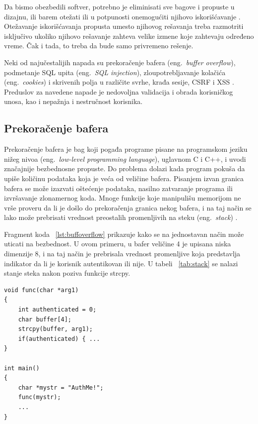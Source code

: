 \documentclass[a4paper]{article}
\begin{document}
Da bismo obezbedili softver, potrebno je eliminisati sve bagove i propuste u dizajnu, ili barem otežati ili u potpunosti onemogućiti njihovo iskorišćavanje \cite{top10flaws}. Otežavanje iskorišćavanja propusta umesto njihovog rešavanja treba razmotriti isključivo ukoliko njihovo rešavanje zahteva velike izmene koje zahtevaju određeno vreme. Čak i tada, to treba da bude samo privremeno rešenje.

Neki od najučestalijih napada su prekoračenje bafera (eng.~{\em buffer overflow}), podmetanje SQL upita (eng.~{\em SQL injection}), zloupotrebljavanje kolačića (eng.~{\em cookies}) i skrivenih polja u različite svrhe, krađa sesije, CSRF i XSS \cite{frontmatter}.
Preduslov za navedene napade je nedovoljna validacija i obrada korisničkog unosa, kao i nepažnja i nestručnost korisnika.

\subsection{Prekoračenje bafera}
\label{subsec:bufferoverflow}
Prekoračenje bafera je bag koji pogađa programe pisane na programskom jeziku nižeg nivoa (eng.~{\em low-level programming language}), uglavnom C i C++, i uvodi značajnije bezbednosne propuste. Do problema dolazi kada program pokuša da upiše količinu podataka koja je veća od veličine bafera. Pisanjem izvan granica bafera se može izazvati oštećenje podataka, nasilno zatvaranje programa ili izvršavanje zlonamernog koda. Mnoge funkcije koje manipulišu memorijom ne vrše proveru da li je došlo do prekoračenja granica nekog bafera, i na taj način se lako može prebrisati vrednost preostalih promenljivih na steku (eng.~{\em stack}) \cite{smashingthestack}.

Fragment koda ~\ref{lst:buffoverflow} prikazuje kako se na jednostavan način može uticati na bezbednost. U ovom primeru, u bafer veličine 4 je upisana niska dimenzije 8, i na taj način je prebrisala vrednost promenljive koja predstavlja indikator da li je korisnik autentikovan ili nije. U tabeli ~\ref{tab:stack} se nalazi stanje steka nakon poziva funkcije strcpy.
\begin{lstlisting}[title={Primer prekoračenja bafera},label={lst:buffoverflow}]
void func(char *arg1)
{
	int authenticated = 0;
	char buffer[4];
	strcpy(buffer, arg1);
	if(authenticated) { ...
}

int main()
{
	char *mystr = "AuthMe!";
	func(mystr);
	...
}
\end{lstlisting}


\end{document}
